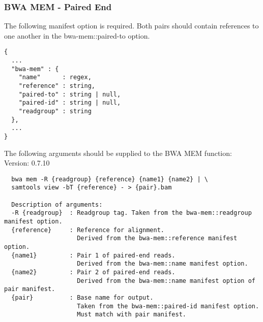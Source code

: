 \subsubsection{BWA MEM - Paired End}
The following manifest option is required. Both pairs should contain references to one another in the bwa-mem::paired-to option.
\begin{verbatim}
{
  ...
  "bwa-mem" : {
    "name"      : regex,
    "reference" : string,
    "paired-to" : string | null,
    "paired-id" : string | null,
    "readgroup" : string
  },
  ...
}
\end{verbatim}
The following arguments should be supplied to the BWA MEM function:\\
Version: 0.7.10
\begin{verbatim}
  bwa mem -R {readgroup} {reference} {name1} {name2} | \
  samtools view -bT {reference} - > {pair}.bam

  Description of arguments:
  -R {readgroup}  : Readgroup tag. Taken from the bwa-mem::readgroup manifest option.
  {reference}     : Reference for alignment.
                    Derived from the bwa-mem::reference manifest option.
  {name1}         : Pair 1 of paired-end reads.
                    Derived from the bwa-mem::name manifest option.
  {name2}         : Pair 2 of paired-end reads.
                    Derived from the bwa-mem::name manifest option of pair manifest.
  {pair}          : Base name for output.
                    Taken from the bwa-mem::paired-id manifest option.
                    Must match with pair manifest.
\end{verbatim}
